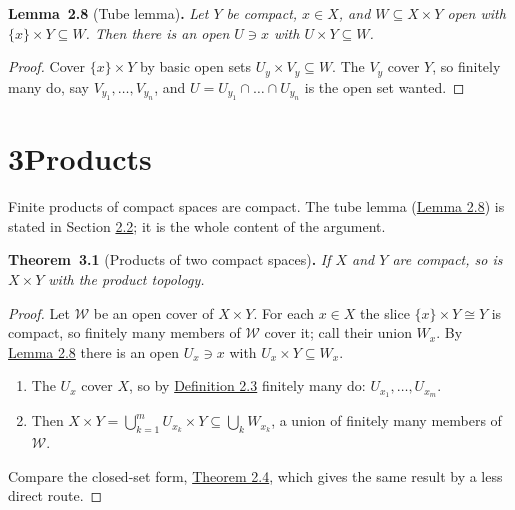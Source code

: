 \documentclass[11pt]{article}
\newenvironment{bpstatement}[2]{\par\addvspace{0.6\baselineskip}\noindent\textbf{#1}#2\textbf{.}\enspace\ignorespaces}
  {\par\addvspace{0.4\baselineskip}}
\newenvironment{bpstatementit}[2]{\begin{bpstatement}{#1}{#2}\itshape\ignorespaces}{\end{bpstatement}}
\providecommand{\fam}{}\renewcommand{\fam}[1]{\mathcal{#1}}
\begin{document}
\label{bp14}%
\begin{bpstatementit}{Lemma~2.8}{ (Tube lemma)}
Let \(Y\) be compact, \(x \in X\), and \(W \subseteq X \times Y\) open with \(\{x\} \times Y \subseteq W\).  Then there is an open \(U \ni x\) with \(U \times Y \subseteq W\).
\end{bpstatementit}
\begin{proof}[{Proof}]\label{bp22}%
Cover \(\{x\} \times Y\) by basic open sets \(U_y \times V_y \subseteq W\).  The \(V_y\) cover \(Y\), so finitely many do, say \(V_{y_1}, \dots, V_{y_n}\), and \(U = U_{y_1} \cap \dots \cap U_{y_n}\) is the open set wanted.
\end{proof}



\section*{\texorpdfstring{3\quad Products}{3 Products}}
\label{bp15}%
Finite products of compact spaces are compact.  The tube lemma (\hyperref[bp14]{Lemma 2.8}) is stated in Section \hyperref[bp7]{2.2}; it is the whole content of the argument.
\label{bp16}%
\begin{bpstatementit}{Theorem~3.1}{ (Products of two compact spaces)}
If \(X\) and \(Y\) are compact, so is \(X \times Y\) with the product topology.

\begin{proof}[{Proof}]
Let \(\fam{W}\) be an open cover of \(X \times Y\).  For each \(x \in X\) the slice \(\{x\} \times Y \cong Y\) is compact, so finitely many members of \(\fam{W}\) cover it; call their union \(W_x\).  By \hyperref[bp14]{Lemma 2.8} there is an open \(U_x \ni x\) with \(U_x \times Y \subseteq W_x\).

\begin{enumerate}
\item The \(U_x\) cover \(X\), so by \hyperref[bp8]{Definition 2.3} finitely many do: \(U_{x_1}, \dots, U_{x_m}\).
\item Then \(X \times Y = \bigcup_{k=1}^{m} U_{x_k} \times Y \subseteq \bigcup_k W_{x_k}\), a union of finitely many members of \(\fam{W}\).
\end{enumerate}

Compare the closed-set form, \hyperref[bp10]{Theorem 2.4}, which gives the same result by a less direct route.
\end{proof}
\end{bpstatementit}
\end{document}
